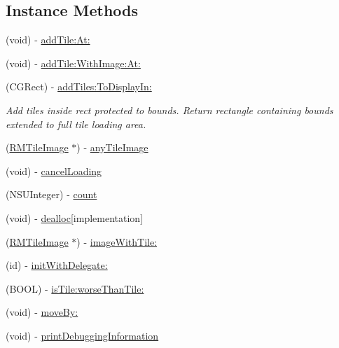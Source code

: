 \subsection*{Instance Methods}
\begin{DoxyCompactItemize}
\item 
(void) -\/ \hyperlink{interface_r_m_tile_image_set_a990ab90cd6ce5ac2670a42c5526bf926}{add\-Tile\-:\-At\-:}
\item 
(void) -\/ \hyperlink{interface_r_m_tile_image_set_a607d09843946f185d98eac9229818208}{add\-Tile\-:\-With\-Image\-:\-At\-:}
\item 
(C\-G\-Rect) -\/ \hyperlink{interface_r_m_tile_image_set_a1504e784537472617052ce292e2d2a0e}{add\-Tiles\-:\-To\-Display\-In\-:}
\begin{DoxyCompactList}\small\item\em Add tiles inside rect protected to bounds. Return rectangle containing bounds extended to full tile loading area. \end{DoxyCompactList}\item 
(\hyperlink{interface_r_m_tile_image}{R\-M\-Tile\-Image} $\ast$) -\/ \hyperlink{interface_r_m_tile_image_set_ac1f03b890d9b409d715f6c11afcde40d}{any\-Tile\-Image}
\item 
(void) -\/ \hyperlink{interface_r_m_tile_image_set_a8014a0648c7764be6ead7cb856806801}{cancel\-Loading}
\item 
(N\-S\-U\-Integer) -\/ \hyperlink{interface_r_m_tile_image_set_a28efc919cb54cf663c4b7dbfed6bcc17}{count}
\item 
(void) -\/ \hyperlink{interface_r_m_tile_image_set_ab78e2e85dadeb20ce888d5cf16c6eb9d}{dealloc}{\ttfamily  \mbox{[}implementation\mbox{]}}
\item 
(\hyperlink{interface_r_m_tile_image}{R\-M\-Tile\-Image} $\ast$) -\/ \hyperlink{interface_r_m_tile_image_set_a271c5b04ec9a7d7360525bd9590f2f31}{image\-With\-Tile\-:}
\item 
(id) -\/ \hyperlink{interface_r_m_tile_image_set_a60719a8e039b1ecda4e97f630f4deb00}{init\-With\-Delegate\-:}
\item 
(B\-O\-O\-L) -\/ \hyperlink{interface_r_m_tile_image_set_a093ea52fbcb7204c15f672c834b51e1a}{is\-Tile\-:worse\-Than\-Tile\-:}
\item 
(void) -\/ \hyperlink{interface_r_m_tile_image_set_ad0e6c33ed7ac1c29e570bfb590599b18}{move\-By\-:}
\item 
(void) -\/ \hyperlink{interface_r_m_tile_image_set_a1281cb94e81e364102cb1ee0cb3b3603}{print\-Debugging\-Information}
\item 

\end{DoxyCompactItemize}
